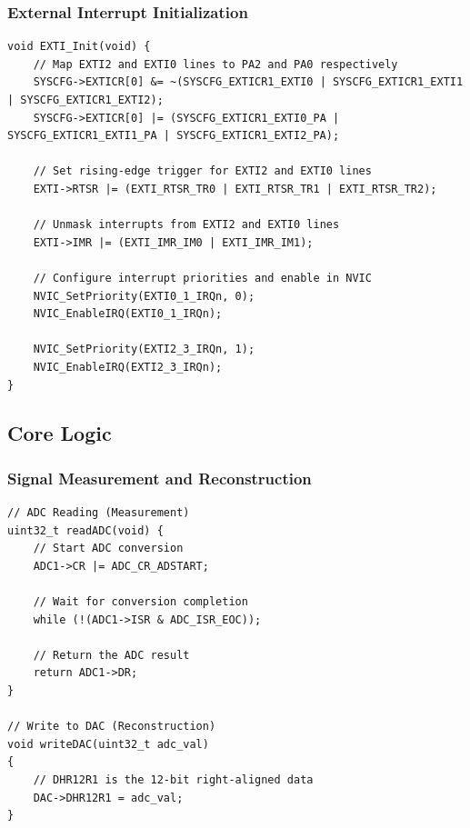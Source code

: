 \subsubsection{External Interrupt Initialization}
\begin{lstlisting}[caption=EXTI Initialization Function \cite{iox}]
void EXTI_Init(void) {
    // Map EXTI2 and EXTI0 lines to PA2 and PA0 respectively
    SYSCFG->EXTICR[0] &= ~(SYSCFG_EXTICR1_EXTI0 | SYSCFG_EXTICR1_EXTI1 | SYSCFG_EXTICR1_EXTI2);
    SYSCFG->EXTICR[0] |= (SYSCFG_EXTICR1_EXTI0_PA | SYSCFG_EXTICR1_EXTI1_PA | SYSCFG_EXTICR1_EXTI2_PA);

    // Set rising-edge trigger for EXTI2 and EXTI0 lines
    EXTI->RTSR |= (EXTI_RTSR_TR0 | EXTI_RTSR_TR1 | EXTI_RTSR_TR2);

    // Unmask interrupts from EXTI2 and EXTI0 lines
    EXTI->IMR |= (EXTI_IMR_IM0 | EXTI_IMR_IM1);

    // Configure interrupt priorities and enable in NVIC
    NVIC_SetPriority(EXTI0_1_IRQn, 0);
    NVIC_EnableIRQ(EXTI0_1_IRQn);

    NVIC_SetPriority(EXTI2_3_IRQn, 1);
    NVIC_EnableIRQ(EXTI2_3_IRQn);
}
\end{lstlisting}

\subsection{Core Logic}

\subsubsection{Signal Measurement and Reconstruction}
\begin{lstlisting}[caption=ADC Reading and DAC Writing Function \cite{interfacex}]
// ADC Reading (Measurement)
uint32_t readADC(void) {
    // Start ADC conversion
    ADC1->CR |= ADC_CR_ADSTART;
    
    // Wait for conversion completion
    while (!(ADC1->ISR & ADC_ISR_EOC));
    
    // Return the ADC result
    return ADC1->DR;
}

// Write to DAC (Reconstruction)
void writeDAC(uint32_t adc_val)
{
	// DHR12R1 is the 12-bit right-aligned data
	DAC->DHR12R1 = adc_val;
}
\end{lstlisting}

